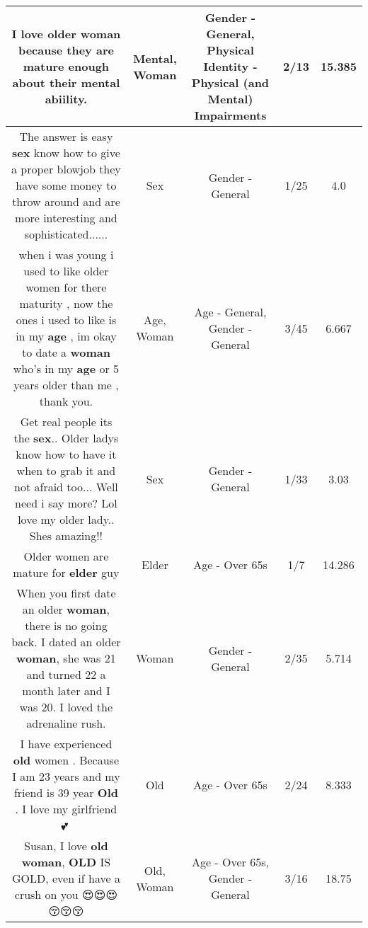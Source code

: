 \documentclass[11pt]{article}
\newlength\mylength
\begin{document}
\begin{center}
\begin{longtable}{|C{.65\mylength}|C{.30\mylength}|C{.12\mylength}|C{.12\mylength}|C{.12\mylength}|}
  \small I love older \textbf{woman} because they are mature enough about their \textbf{mental} abiility.\normalsize   & Mental, Woman & Gender - General, Physical Identity - Physical (and Mental) Impairments & 2/13 & 15.385 \\  \hline
  \small The answer is easy \textbf{sex} know how to give a proper blowjob they have some money to throw around and are more interesting and sophisticated......\normalsize   & Sex & Gender - General & 1/25 & 4.0 \\  \hline
  \small when i was young i used to like older women for there maturity , now the ones i used to like is in my \textbf{age} , im okay to date a \textbf{woman} who's in my \textbf{age} or 5 years older than me , thank you.\normalsize   & Age, Woman & Age - General, Gender - General & 3/45 & 6.667 \\  \hline
  \small Get real people its the \textbf{sex}.. Older ladys know how to have it when to grab it and not afraid too... Well need i say more? Lol love my older lady.. Shes amazing!!\normalsize   & Sex & Gender - General & 1/33 & 3.03 \\  \hline
  \small Older women are mature for \textbf{elder} guy\normalsize   & Elder & Age - Over 65s & 1/7 & 14.286 \\  \hline
  \small When you first date an older \textbf{woman}, there is no going back. I dated an older \textbf{woman}, she was 21 and turned 22 a month later and I was 20. I loved the adrenaline rush.\normalsize   & Woman & Gender - General & 2/35 & 5.714 \\  \hline
  \small I have experienced \textbf{old} women . Because  I am 23 years and my friend is 39 year \textbf{Old} .  I love my girlfriend 💕💞\normalsize   & Old & Age - Over 65s & 2/24 & 8.333 \\  \hline
  \small Susan, I love \textbf{old} \textbf{woman},  \textbf{OLD} IS GOLD,  even if have a crush on you 😍😍😍😚😚😚\normalsize   & Old, Woman & Age - Over 65s, Gender - General & 3/16 & 18.75 \\  \hline

\end{longtable}
\end{center}
\end{document}
